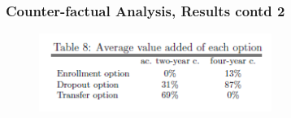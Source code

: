 \begin{frame}
	\frametitle{Counter-factual Analysis, Results contd 2}
		\begin{figure}[H] 
				\caption*{}
				\centering
				\includegraphics[width=3in, height=1in]{Figures/T/table8.png}
		\end{figure}
\end{frame}




























